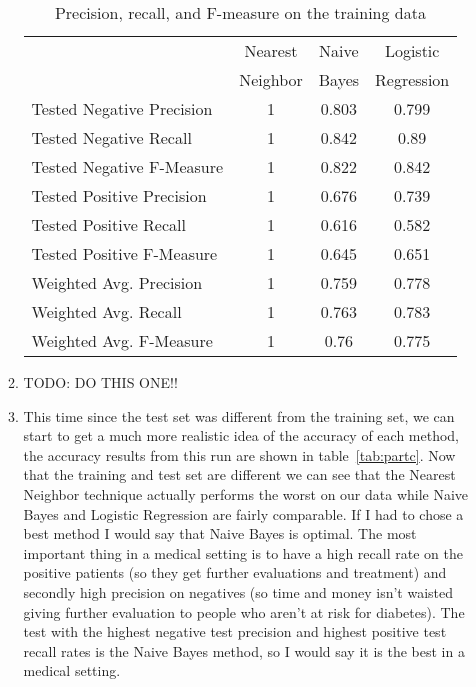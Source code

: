 \documentclass[12pt]{article}
\begin{document}
\begin{enumerate}
\begin{enumerate}
\begin{table}[htdp]
\caption{Precision, recall, and F-measure on the training data}
\begin{center}
\begin{tabular}{l||c|c|c|}
               & Nearest & Naive & Logistic  \\
               & Neighbor &  Bayes & Regression  \\
               \hline
Tested Negative Precision & 1 & 0.803 & 0.799 \\
Tested Negative Recall &1  &  0.842 & 0.89 \\
Tested Negative F-Measure &  1& 0.822 & 0.842 \\
Tested Positive Precision & 1 & 0.676 & 0.739 \\
Tested Positive Recall &1  & 0.616 & 0.582 \\
Tested Positive F-Measure &  1 & 0.645 & 0.651 \\
Weighted Avg. Precision & 1 & 0.759 & 0.778\\
Weighted Avg. Recall & 1 & 0.763 & 0.783 \\
Weighted Avg. F-Measure & 1  & 0.76  &  0.775 \\
\end{tabular}
\end{center}
\label{tab:parta}
\end{table}%


\item %
TODO: DO THIS ONE!!


\item %
This time since the test set was different from the training set, we can start to get a much more realistic idea of the accuracy of each method, the accuracy results from this run are shown in table~\ref{tab:partc}. Now that the training and test set are different we can see that the Nearest Neighbor technique actually performs the worst on our data while Naive Bayes and Logistic Regression are fairly comparable. If I had to chose a best method I would say that Naive Bayes is optimal. The most important thing in a medical setting is to have a high recall rate on the positive patients (so they get further evaluations and treatment) and secondly high precision on negatives (so time and money isn't waisted giving further evaluation to people who aren't at risk for diabetes). The test with the highest negative test precision and highest positive test recall rates is the Naive Bayes method, so I would say it is the best in a medical setting.



\end{enumerate}
\end{enumerate}
\end{document}
